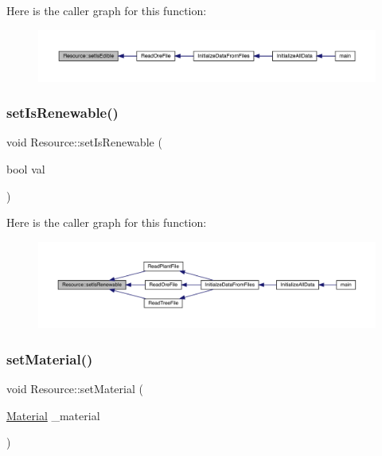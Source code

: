 Here is the caller graph for this function\+:
\nopagebreak
\begin{figure}[H]
\begin{center}
\leavevmode
\includegraphics[width=350pt]{df/d00/class_resource_a1dab6f1bc6f8794735a6e64c43415587_icgraph}
\end{center}
\end{figure}
\mbox{\label{class_resource_a0782d1437059c7e8449b2c677f9c4b08}} 
\subsubsection{\texorpdfstring{set\+Is\+Renewable()}{setIsRenewable()}}
{\footnotesize\ttfamily void Resource\+::set\+Is\+Renewable (\begin{DoxyParamCaption}\item[{bool}]{val }\end{DoxyParamCaption})}

Here is the caller graph for this function\+:
\nopagebreak
\begin{figure}[H]
\begin{center}
\leavevmode
\includegraphics[width=350pt]{df/d00/class_resource_a0782d1437059c7e8449b2c677f9c4b08_icgraph}
\end{center}
\end{figure}
\mbox{\label{class_resource_a84958f14311775c18c24cb69d43a74d0}} 
\subsubsection{\texorpdfstring{set\+Material()}{setMaterial()}}
{\footnotesize\ttfamily void Resource\+::set\+Material (\begin{DoxyParamCaption}\item[{\mbox{\hyperlink{class_material}{Material}}}]{\+\_\+material }\end{DoxyParamCaption})}

